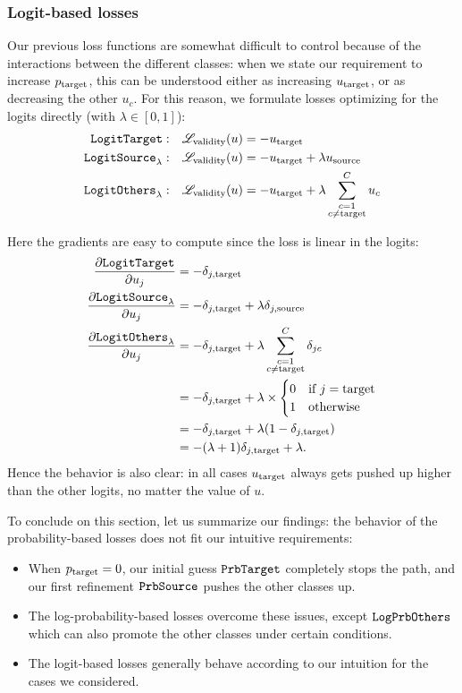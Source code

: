 \documentclass[../main.tex]{subfiles}
\begin{document}
\subsubsection{Logit-based losses}

Our previous loss functions are somewhat difficult to control because of the interactions between the different classes:
when we state our requirement to increase $p_{\mathrm{target}}$, this can be understood either as increasing $u_{\mathrm{target}}$, or as decreasing the other $u_c$.
For this reason, we formulate losses optimizing for the logits directly (with $\lambda \in [0, 1]$):
\begin{align*}
    \mathtt{LogitTarget}{}:        & \quad    \mathscr{L}_\text{validity}(u) = - u_{\mathrm{target}}                         \\
    \mathtt{LogitSource}_{\lambda}: & \quad     \mathscr{L}_\text{validity}(u) = - u_{\mathrm{target}} + \lambda u_{\mathrm{source}}    \\
    \mathtt{LogitOthers}_{\lambda}: & \quad    \mathscr{L}_\text{validity}(u) = - u_{\mathrm{target}} + \lambda \sum_{\substack{{c}=1 \\ {c} \neq \mathrm{target}}}^C u_c
\end{align*}

Here the gradients are easy to compute since the loss is linear in the logits:
\begin{align*}
\frac{\partial \mathtt{LogitTarget}{}}{\partial u_j} &= - \delta_{j, \mathrm{target}}                         \\
\frac{\partial \mathtt{LogitSource}_{\lambda}}{\partial u_j} &= - \delta_{j, \mathrm{target}} + \lambda \delta_{j, \mathrm{source}}                        \\
\frac{\partial \mathtt{LogitOthers}_{\lambda}}{\partial u_j}
&= - \delta_{j, \mathrm{target}} + \lambda \sum_{\substack{{c}=1 \\ {c} \neq \mathrm{target}}}^C \delta_{jc} \\
&= - \delta_{j, \mathrm{target}} + \lambda \times \begin{cases}
    0 & \text{if } j = \mathrm{target} \\
    1 & \text{otherwise} 
\end{cases} \\
&= - \delta_{j, \mathrm{target}} + \lambda (1 - \delta_{j, \mathrm{target}}) \\
&= -(\lambda + 1)\delta_{j, \mathrm{target}} + \lambda.
\end{align*}
Hence the behavior is also clear: in all cases $u_{\mathrm{target}}$ always gets pushed up higher than the other logits, no matter the value of $u$.

To conclude on this section, let us summarize our findings:
the behavior of the probability-based losses does not fit our intuitive requirements:
\begin{itemize}
    \item When $p_{\mathrm{target}} = 0$, our initial guess $\mathtt{PrbTarget}$ completely stops the path, and our first
    refinement $\mathtt{PrbSource}_{}$ pushes the other classes up.
    \item The log-probability-based losses overcome these issues, except $\mathtt{LogPrbOthers}_{}$ which can also
    promote the other classes under certain conditions.
    \item The logit-based losses generally behave according to our intuition for the cases we considered.
\end{itemize}
\end{document}
